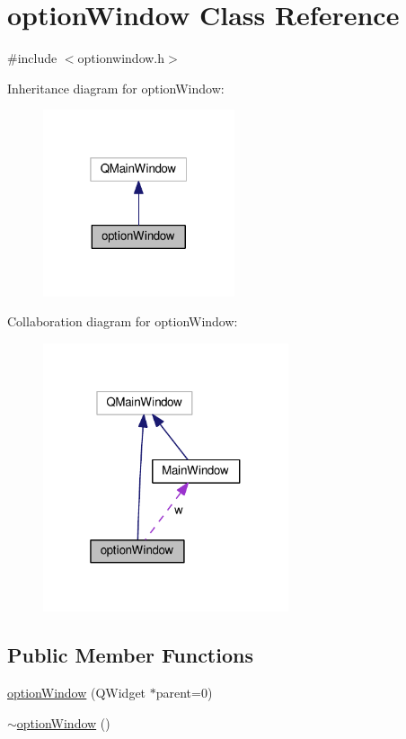 \hypertarget{classoptionWindow}{}\section{option\+Window Class Reference}
\label{classoptionWindow}


{\ttfamily \#include $<$optionwindow.\+h$>$}



Inheritance diagram for option\+Window\+:
\nopagebreak
\begin{figure}[H]
\begin{center}
\leavevmode
\includegraphics[width=160pt]{classoptionWindow__inherit__graph}
\end{center}
\end{figure}


Collaboration diagram for option\+Window\+:
\nopagebreak
\begin{figure}[H]
\begin{center}
\leavevmode
\includegraphics[width=205pt]{classoptionWindow__coll__graph}
\end{center}
\end{figure}
\subsection*{Public Member Functions}
\begin{DoxyCompactItemize}
\item 
\hyperlink{classoptionWindow_a520eacaa5cabadee57621a9a24345302}{option\+Window} (Q\+Widget $\ast$parent=0)
\item 
\hyperlink{classoptionWindow_a767beb27d15754996076ff312ae2877f}{$\sim$option\+Window} ()
\end{DoxyCompactItemize}
